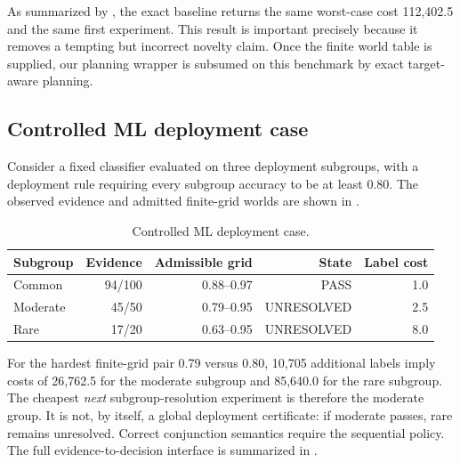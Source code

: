 \documentclass[11pt]{article}
\begin{document}
As summarized by , the exact baseline returns the same worst-case cost 112,402.5 and the same first experiment. This result is important precisely because it removes a tempting but incorrect novelty claim. Once the finite world table is supplied, our planning wrapper is subsumed on this benchmark by exact target-aware planning.

\subsection{Controlled ML deployment case}
Consider a fixed classifier evaluated on three deployment subgroups, with a deployment rule requiring every subgroup accuracy to be at least 0.80. The observed evidence and admitted finite-grid worlds are shown in .

\begin{table}[H]
\centering
\caption{Controlled ML deployment case.}
\label{tab:deployment}
\begin{tabular}{lrrrr}
\toprule
Subgroup & Evidence & Admissible grid & State & Label cost\\
\midrule
Common & 94/100 & 0.88--0.97 & PASS & 1.0\\
Moderate & 45/50 & 0.79--0.95 & UNRESOLVED & 2.5\\
Rare & 17/20 & 0.63--0.95 & UNRESOLVED & 8.0\\
\bottomrule
\end{tabular}
\end{table}

For the hardest finite-grid pair 0.79 versus 0.80, 10,705 additional labels imply costs of 26,762.5 for the moderate subgroup and 85,640.0 for the rare subgroup. The cheapest \emph{next} subgroup-resolution experiment is therefore the moderate group. It is not, by itself, a global deployment certificate: if moderate passes, rare remains unresolved. Correct conjunction semantics require the sequential policy. The full evidence-to-decision interface is summarized in .
\end{document}
